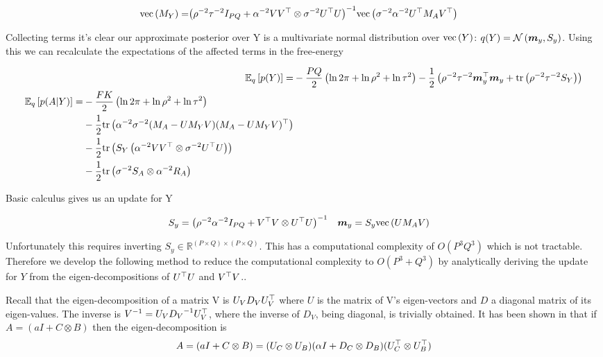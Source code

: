 \begin{align}
\text{vec}\left(M_Y\right) = & {\left( \rho^{-2}\tau^{-2} I_{PQ} + \alpha^{-2}V V^\top \otimes \sigma^{-2} U ^\top U \right)}^{-1}\text{vec}\left(\sigma^{-2}\alpha^{-2} U^\top M_A V^\top\right)
\end{align}

Collecting terms it's clear our approximate posterior over Y is a multivariate normal distribution over $\text{vec}\left(Y\right)$: $q(Y) = \mathcal{N} \left( {\bm m_y}, {S_y} \right)$. Using this we can recalculate the expectations of the affected terms in the free-energy

\begin{align}
\ex{p(Y)}{q} = & -\halve{PQ}\left(\ln 2\pi + \ln \rho^2 + \ln \tau^2\right) - \half \left(\rho^{-2}\tau^{-2} \vv{m}_y\T\vv{m}_y + \Tr{\rho^{-2}\tau^{-2} S_Y}\right) \\
\begin{split}
\ex{p(A|Y)}{q} = & -\halve{FK}\left(\ln 2\pi + \ln \rho^2 + \ln \tau^2\right) \\
 & -\half \Tr{\alpha^{-2}\sigma^{-2}(M_A - U M_Y V)(M_A - U M_Y V)\T} \\
 & -\half \Tr{S_Y \left(\alpha^{-2}V V\T \otimes \sigma^{-2}U \T U\right)} \\
 & -\half \Tr{\sigma^{-2}S_A\otimes \alpha^{-2}R_A}
 \label{eqn:free_enery_u_and_v}
\end{split}
\end{align}

Basic calculus gives us an update for Y

\begin{align}
S_y & = {\left( \rho^{-2} \alpha^{-2} I_{PQ} + V^\top V \otimes U^\top U \right)}^{-1}
&
\bm m_y & = S_y \text{vec}\left(U M_A V\right)
\end{align}

Unfortunately this requires inverting $S_y \in \mathbb{R}^{(P \times Q) \times (P \times Q)}$. This has a computational complexity of $O(P^3Q^3)$ which is not tractable. Therefore we develop the following method to reduce the computational complexity to $O(P^3 + Q^3)$ by analytically deriving the update for $Y$ from the eigen-decompositions of $U^\top U$ and $V^\top V$..

Recall that the eigen-decomposition of a matrix V is $U_V D_V U_V^\top$ where $U$ is the matrix of V's eigen-vectors and $D$ a diagonal matrix of its eigen-values. The inverse is ${V}^{-1} = U_V {D_V}^{-1} U_V^\top$, where the inverse of $D_V$, being diagonal, is trivially obtained. It has been shown in \cite{Stegle2011} that if $A = (a I + C \otimes B)$ then the eigen-decomposition is
\begin{align}
A = (a I + C \otimes B) = (U_C \otimes U_B)(\alpha I + D_C \otimes D_B)(U_C^\top \otimes U_B^\top)
\end{align}

